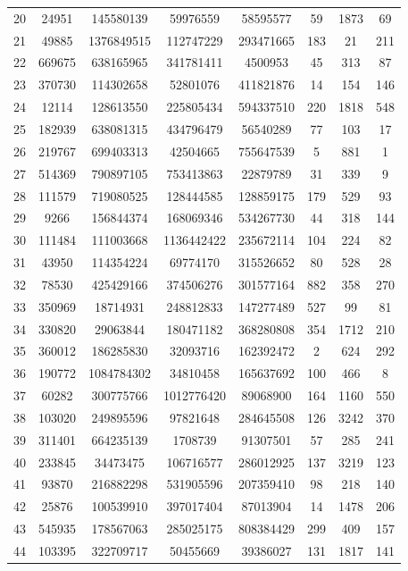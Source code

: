 \documentclass[11pt]{article}
\begin{document}
\begin{table}[h!]
\begin{tabular}{p{1cm}|C| C | C | C | C | C | C}
20 & 24951 & 145580139 & 59976559 & 58595577 & 59 & 1873 & 69 \\ 
21 & 49885 & 1376849515 & 112747229 & 293471665 & 183 & 21 & 211 \\ 
22 & 669675 & 638165965 & 341781411 & 4500953 & 45 & 313 & 87 \\ 
23 & 370730 & 114302658 & 52801076 & 411821876 & 14 & 154 & 146 \\ 
24 & 12114 & 128613550 & 225805434 & 594337510 & 220 & 1818 & 548 \\ 
25 & 182939 & 638081315 & 434796479 & 56540289 & 77 & 103 & 17 \\ 
26 & 219767 & 699403313 & 42504665 & 755647539 & 5 & 881 & 1 \\ 
27 & 514369 & 790897105 & 753413863 & 22879789 & 31 & 339 & 9 \\ 
28 & 111579 & 719080525 & 128444585 & 128859175 & 179 & 529 & 93 \\ 
29 & 9266 & 156844374 & 168069346 & 534267730 & 44 & 318 & 144 \\ 
30 & 111484 & 111003668 & 1136442422 & 235672114 & 104 & 224 & 82 \\ 
31 & 43950 & 114354224 & 69774170 & 315526652 & 80 & 528 & 28 \\ 
32 & 78530 & 425429166 & 374506276 & 301577164 & 882 & 358 & 270 \\ 
33 & 350969 & 18714931 & 248812833 & 147277489 & 527 & 99 & 81 \\ 
34 & 330820 & 29063844 & 180471182 & 368280808 & 354 & 1712 & 210 \\ 
35 & 360012 & 186285830 & 32093716 & 162392472 & 2 & 624 & 292 \\ 
36 & 190772 & 1084784302 & 34810458 & 165637692 & 100 & 466 & 8 \\ 
37 & 60282 & 300775766 & 1012776420 & 89068900 & 164 & 1160 & 550 \\ 
38 & 103020 & 249895596 & 97821648 & 284645508 & 126 & 3242 & 370 \\ 
39 & 311401 & 664235139 & 1708739 & 91307501 & 57 & 285 & 241 \\ 
40 & 233845 & 34473475 & 106716577 & 286012925 & 137 & 3219 & 123 \\ 
41 & 93870 & 216882298 & 531905596 & 207359410 & 98 & 218 & 140 \\ 
42 & 25876 & 100539910 & 397017404 & 87013904 & 14 & 1478 & 206 \\ 
43 & 545935 & 178567063 & 285025175 & 808384429 & 299 & 409 & 157 \\ 
44 & 103395 & 322709717 & 50455669 & 39386027 & 131 & 1817 & 141 \\ 

\end{tabular}
\end{table}
\end{document}
